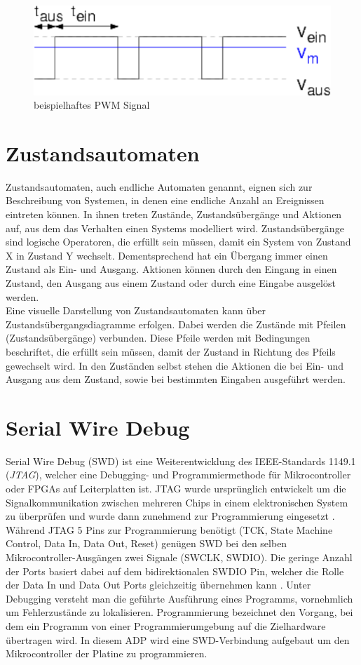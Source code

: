 \begin{figure}
	\centering
		\includegraphics{Bilder/PWM.pdf}
	\caption{beispielhaftes PWM Signal}
	\label{fig:PWM}
\end{figure}

\section{Zustandsautomaten}
Zustandsautomaten, auch endliche Automaten genannt, eignen sich zur Beschreibung von Systemen, in denen eine endliche Anzahl an Ereignissen eintreten können. In ihnen treten Zustände, Zustandsübergänge und Aktionen auf, aus dem das Verhalten einen Systems modelliert wird. Zustandsübergänge sind logische Operatoren, die erfüllt sein müssen, damit ein System von Zustand X in Zustand Y wechselt. Dementsprechend hat ein Übergang immer einen Zustand als Ein- und Ausgang. Aktionen können durch den Eingang in einen Zustand, den Ausgang aus einem Zustand oder durch eine Eingabe ausgelöst werden. \\
Eine visuelle Darstellung von Zustandsautomaten kann über Zustandsübergangsdiagramme erfolgen. Dabei werden die Zustände mit Pfeilen (Zustandsübergänge) verbunden. Diese Pfeile werden mit Bedingungen beschriftet, die erfüllt sein müssen, damit der Zustand in Richtung des Pfeils gewechselt wird. In den Zuständen selbst stehen die Aktionen die bei Ein- und Ausgang aus dem Zustand, sowie bei bestimmten Eingaben ausgeführt werden.

\section{Serial Wire Debug}
Serial Wire Debug (SWD) ist eine Weiterentwicklung des IEEE-Standards 1149.1 (\textit{JTAG}), welcher eine Debugging- und Programmiermethode für Mikrocontroller oder FPGAs auf Leiterplatten ist. JTAG wurde ursprünglich entwickelt um die Signalkommunikation zwischen mehreren Chips in einem elektronischen System zu überprüfen und wurde dann zunehmend zur Programmierung eingesetzt \cite{swd}. Während JTAG 5 Pins zur Programmierung benötigt (TCK, State Machine Control, Data In, Data Out, Reset) genügen SWD bei den selben Mikrocontroller-Ausgängen zwei Signale (SWCLK, SWDIO). Die geringe Anzahl der Ports basiert dabei auf dem bidirektionalen SWDIO Pin, welcher die Rolle der Data In und Data Out Ports gleichzeitig übernehmen kann \cite{swd}. Unter Debugging versteht man die geführte Ausführung eines Programms, vornehmlich um Fehlerzustände zu lokalisieren. Programmierung bezeichnet den Vorgang, bei dem ein Programm von einer Programmierumgebung auf die Zielhardware übertragen wird. In diesem ADP wird eine SWD-Verbindung aufgebaut um den Mikrocontroller der Platine zu programmieren.
